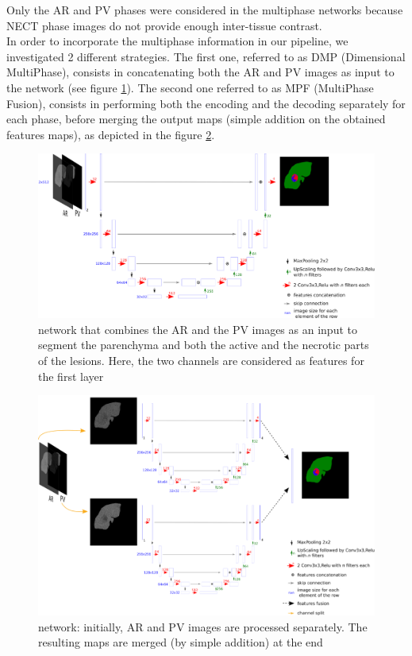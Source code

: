 Only the AR and PV phases were considered in the
multiphase networks because NECT phase images do not provide enough
inter-tissue contrast. \\
In order to incorporate the multiphase information in our pipeline, we
investigated 2 different strategies. The first one, referred to as DMP (Dimensional MultiPhase), consists in concatenating both the
AR and PV images as input to the network (see figure \ref{CARS_DMP_Full_Fig}).
The second one referred to as MPF (MultiPhase Fusion), consists
in performing both the encoding and the decoding separately for each
phase, before merging the output maps (simple addition on the obtained
features maps), as depicted in the figure \ref{CARS_MPF_Full_Fig}.

\begin{figure}[th!]
	\centering
	\includegraphics[width=0.9\linewidth]{images/image28}
	\caption{ network that combines the AR and the PV images as an input to segment the parenchyma and both the active and the necrotic parts of the lesions. Here, the two channels are considered as features for the first layer}
	\label{CARS_DMP_Full_Fig}
\end{figure}


\begin{figure}[th!]
	\centering
	\includegraphics[width=0.9\linewidth]{images/image36}
	\caption{ network: initially, AR and PV images are processed separately. The resulting maps are merged (by simple addition) at the end}
	\label{CARS_MPF_Full_Fig}
\end{figure}





